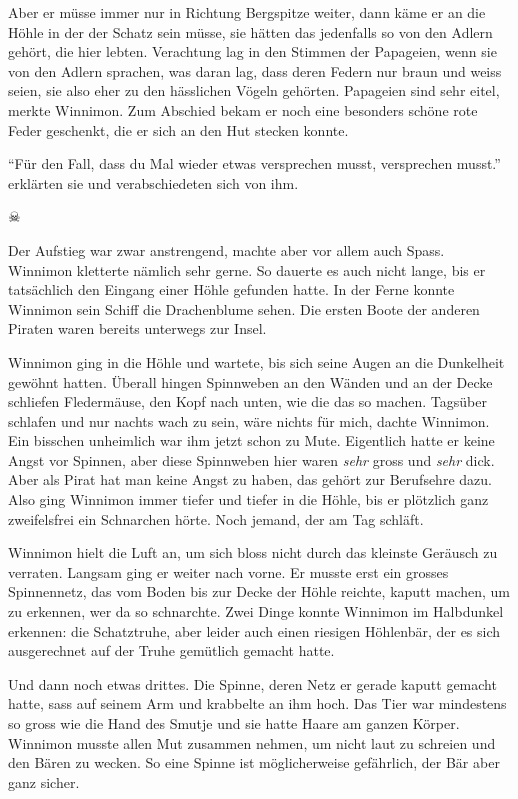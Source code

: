 Aber er müsse immer nur in Richtung Bergspitze weiter, dann käme er an die Höhle in der der Schatz sein müsse, sie hätten das jedenfalls so von den Adlern gehört, die hier lebten. Verachtung lag in den Stimmen der Papageien, wenn sie von den Adlern sprachen, was daran lag, dass deren Federn nur braun und weiss seien, sie also eher zu den hässlichen Vögeln gehörten. Papageien sind sehr eitel, merkte Winnimon. Zum Abschied bekam er noch eine besonders schöne rote Feder geschenkt, die er sich an den Hut stecken konnte. 

\enquote{Für den Fall, dass du Mal wieder etwas versprechen musst, versprechen musst.} erklärten sie und verabschiedeten sich von ihm.

\begin{center}
{ $\skull$}
\end{center}

Der Aufstieg war zwar anstrengend, machte aber vor allem auch Spass. Winnimon kletterte nämlich sehr gerne. So dauerte es auch nicht lange, bis er tatsächlich den Eingang einer Höhle gefunden hatte. In der Ferne konnte Winnimon sein Schiff die Drachenblume sehen. Die ersten Boote der anderen Piraten waren bereits unterwegs zur Insel.

Winnimon ging in die Höhle und wartete, bis sich seine Augen an die Dunkelheit gewöhnt hatten. Überall hingen Spinnweben an den Wänden und an der Decke schliefen Fledermäuse, den Kopf nach unten, wie die das so machen. Tagsüber schlafen und nur nachts wach zu sein, wäre nichts für mich, dachte Winnimon. Ein bisschen unheimlich war ihm jetzt schon zu Mute. Eigentlich hatte er keine Angst vor Spinnen, aber diese Spinnweben hier waren \emph{sehr} gross und \emph{sehr} dick. Aber als Pirat hat man keine Angst zu haben, das gehört zur Berufsehre dazu. Also ging Winnimon immer tiefer und tiefer in die Höhle, bis er plötzlich ganz zweifelsfrei ein Schnarchen hörte. Noch jemand, der am Tag schläft.

Winnimon hielt die Luft an, um sich bloss nicht durch das kleinste Geräusch zu verraten. Langsam ging er weiter nach vorne. Er musste erst ein grosses Spinnennetz, das vom Boden bis zur Decke der Höhle reichte, kaputt machen, um zu erkennen, wer da so schnarchte. Zwei Dinge konnte Winnimon im Halbdunkel erkennen: die Schatztruhe, aber leider auch einen riesigen Höhlenbär, der es sich ausgerechnet auf der Truhe gemütlich gemacht hatte.

Und dann noch etwas drittes. Die Spinne, deren Netz er gerade kaputt gemacht hatte, sass auf seinem Arm und krabbelte an ihm hoch. Das Tier war mindestens so gross wie die Hand des Smutje und sie hatte Haare am ganzen Körper. Winnimon musste allen Mut zusammen nehmen, um nicht laut zu schreien und den Bären zu wecken. So eine Spinne ist möglicherweise gefährlich, der Bär aber ganz sicher.


